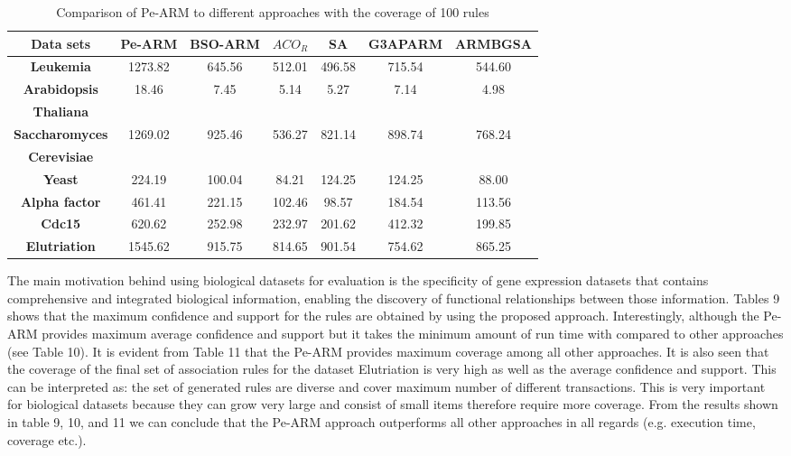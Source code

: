 \documentclass[preprint,12pt]{elsarticle}
\begin{document}
\begin{table}
\small
\centering
\caption{Comparison of Pe-ARM to  different approaches with the coverage of 100 rules}
\begin{tabular}{c c c c c c c}
\toprule
\textbf{Data sets} & Pe-ARM& BSO-ARM & $ACO_{R}$ & SA & G3APARM & ARMBGSA \\
\midrule
\textbf{Leukemia}                 &  1273.82  & 645.56 & 512.01 & 496.58 & 715.54 & 544.60 \\\hline
\textbf{Arabidopsis }     &  \multirow{2}{*}{18.46 }     & \multirow{2}{*}{7.45} & \multirow{2}{*}{5.14  } & \multirow{2}{*}{5.27} & \multirow{2}{*}{7.14 }  & \multirow{2}{*}{4.98}  \\
\textbf{Thaliana} &   & &	 &  &  & \\\hline
\textbf{Saccharomyces } &  \multirow{2}{*}{1269.02}  & \multirow{2}{*}{925.46} & \multirow{2}{*}{536.27} & \multirow{2}{*}{821.14} & \multirow{2}{*}{898.74} & \multirow{2}{*}{768.24}  \\
\textbf{Cerevisiae} &   & &	 &  &  & \\\hline

\textbf{Yeast}                    &  224.19    & 100.04& 84.21  & 124.25 & 124.25 & 88.00 \\\hline
\textbf{Alpha factor}             &  461.41   & 221.15 & 102.46 & 98.57 & 184.54 & 113.56\\\hline
\textbf{Cdc15}                    &  620.62    & 252.98&  232.97& 201.62 & 412.32 & 199.85 \\\hline
\textbf{Elutriation}              &  1545.62   & 915.75&  814.65& 901.54 & 754.62 & 865.25\\\hline

\bottomrule
\end{tabular}
\end{table}


The main motivation behind using biological datasets for evaluation is the 
specificity of gene expression datasets that contains comprehensive and integrated biological information, 
enabling the discovery of functional relationships between those information. Tables 9 shows that the maximum confidence and support for the rules are obtained by using the proposed approach. Interestingly, although the Pe-ARM provides maximum average confidence and support but it takes the minimum amount of run time with compared to other approaches (see Table 10). It is evident from Table 11 that the Pe-ARM provides maximum coverage among all other approaches. It is also seen that the coverage of the final set of association rules for the dataset Elutriation 
is very high as well as the average confidence and support. This can be interpreted as: the set of generated rules are diverse and cover maximum number of different transactions. This is very important for biological datasets because they can grow very large and consist of small items therefore require more coverage. From the results shown in table 9, 10, and 11 we can conclude that the Pe-ARM approach outperforms all other approaches in all regards (e.g. execution time, coverage etc.).
\end{document}

